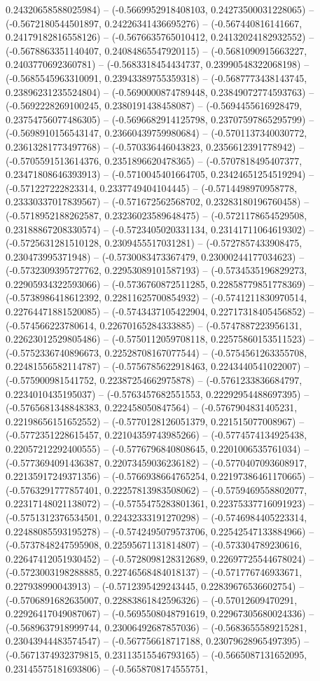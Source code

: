 0.24320658588025984) -- (-0.5669952918408103, 0.24273500031228065) -- (-0.5672180544501897, 0.24226341436695276) -- (-0.567440816141667, 0.24179182816558126) -- (-0.5676635765010412, 0.24132024182932552) -- (-0.5678863351140407, 0.24084865547920115) -- (-0.5681090915663227, 0.2403770692360781) -- (-0.5683318454434737, 0.23990548322068198) -- (-0.5685545963310091, 0.23943389755359318) -- (-0.5687773438143745, 0.23896231235524804) -- (-0.5690000874789448, 0.23849072774593763) -- (-0.5692228269100245, 0.2380191438458087) -- (-0.5694455616928479, 0.23754756077486305) -- (-0.5696682914125798, 0.23707597865295799) -- (-0.5698910156543147, 0.23660439759980684) -- (-0.5701137340030772, 0.23613281773497768) -- (-0.570336446043823, 0.2356612391778942) -- (-0.5705591513614376, 0.2351896620478365) -- (-0.5707818495407377, 0.23471808646393913) -- (-0.5710045401664705, 0.23424651254519294) -- (-0.571227222823314, 0.2337749404104445) -- (-0.5714498970958778, 0.23330337017839567) -- (-0.571672562568702, 0.23283180196760458) -- (-0.5718952188262587, 0.23236023589648475) -- (-0.5721178654529508, 0.23188867208330574) -- (-0.5723405020331134, 0.23141711064619302) -- (-0.5725631281510128, 0.2309455517031281) -- (-0.5727857433908475, 0.230473995371948) -- (-0.5730083473367479, 0.23000244177034623) -- (-0.5732309395727762, 0.22953089101587193) -- (-0.5734535196829273, 0.22905934322593066) -- (-0.5736760872511285, 0.22858779851778369) -- (-0.5738986418612392, 0.22811625700854932) -- (-0.5741211830970514, 0.22764471881520085) -- (-0.5743437105422904, 0.22717318405456852) -- (-0.574566223780614, 0.22670165284333885) -- (-0.5747887223956131, 0.22623012529805486) -- (-0.5750112059708118, 0.22575860153511523) -- (-0.5752336740896673, 0.22528708167077544) -- (-0.5754561263355708, 0.22481556582114787) -- (-0.5756785622918463, 0.2243440541022007) -- (-0.575900981541752, 0.22387254662975878) -- (-0.5761233836684797, 0.2234010435195037) -- (-0.5763457682551553, 0.22292954488697395) -- (-0.5765681348848383, 0.222458050847564) -- (-0.5767904831405231, 0.22198656151652552) -- (-0.5770128126051379, 0.221515077008967) -- (-0.5772351228615457, 0.22104359743985266) -- (-0.5774574134925438, 0.22057212292400555) -- (-0.5776796840808645, 0.2201006535761034) -- (-0.5773694091436387, 0.22073459036236182) -- (-0.5770407093608917, 0.22135917249371356) -- (-0.5766938664765254, 0.22197386461170665) -- (-0.5763291777857401, 0.22257813983508062) -- (-0.5759469558802077, 0.22317148021138072) -- (-0.5755475283801361, 0.22375337716091923) -- (-0.5751312376534501, 0.22432333191270298) -- (-0.5746984405223314, 0.22488085593195278) -- (-0.5742495079573706, 0.22542547133884966) -- (-0.5737848247595908, 0.22595671131814807) -- (-0.573304789230616, 0.22647412051930452) -- (-0.5728098128312689, 0.22697725544678024) -- (-0.5723003198288885, 0.22746568484018137) -- (-0.571776746933671, 0.227938990043913) -- (-0.5712395429243445, 0.22839676536602754) -- (-0.5706891682635007, 0.22883861842596326) -- (-0.57012609470291, 0.22926417049087067) -- (-0.5695508048791619, 0.22967305680024336) -- (-0.5689637918999744, 0.23006492687857036) -- (-0.5683655589215281, 0.23043944483574547) -- (-0.567756618717188, 0.23079628965497395) -- (-0.5671374932379815, 0.23113515546793165) -- (-0.5665087131652095, 0.23145575181693806) -- (-0.5658708174555751, 